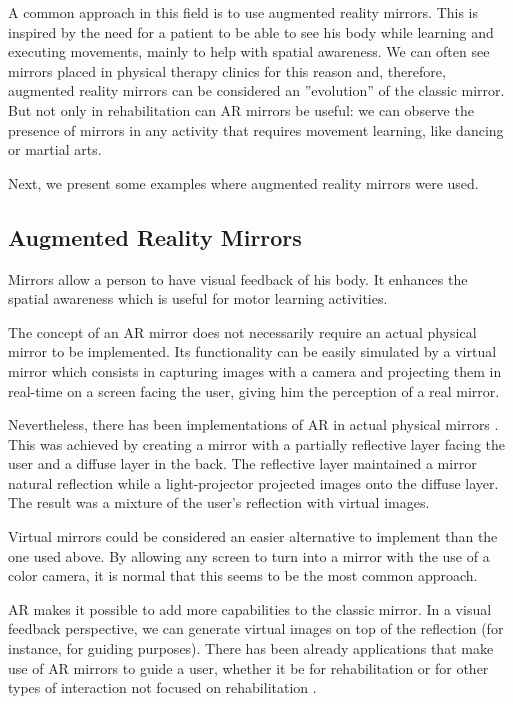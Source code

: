 A common approach in this field is to use augmented reality mirrors. 
This is inspired by the need for a patient to be able to see his body while
learning and executing movements, mainly to help with spatial awareness. We can often
see mirrors placed in physical therapy clinics for this reason and, therefore, 
augmented reality mirrors can be considered an ''evolution'' of the classic mirror.
But not only in rehabilitation can \ac{AR} mirrors be useful: we can observe 
the presence of mirrors in any activity that requires movement learning, like dancing or martial arts.

Next, we present some examples where augmented reality mirrors were used.



\subsection{Augmented Reality Mirrors}
\label{RW-mirrors}
Mirrors allow a person to have visual feedback of his body. It enhances the spatial awareness which is useful for motor learning activities.

The concept of an \ac{AR} mirror does not necessarily require an 
actual physical mirror to be implemented. 
Its functionality can be easily simulated by a virtual mirror 
which consists in capturing images with a camera and projecting 
them in real-time on a screen facing the user, 
giving him the perception of a real mirror. 

Nevertheless, there has been implementations of \ac{AR} in actual physical mirrors \cite{Anderson}. 
This was achieved by creating a mirror with a partially reflective layer facing the user and a diffuse layer in the back. 
The reflective layer maintained a mirror natural reflection while a light-projector projected images onto the diffuse layer.
The result was a mixture of the user's reflection with virtual images.

Virtual mirrors could be considered an easier alternative to implement than the one used above. 
By allowing any screen to turn into a mirror with the use of a color camera, 
it is normal that this seems to be the most common approach.

%

\ac{AR} makes it possible to add more capabilities to the classic mirror. 
In a visual feedback perspective, we can generate virtual images on top of the reflection (for instance, for guiding purposes). 
There has been already applications that make use of \ac{AR} mirrors to guide a user, whether it be for rehabilitation \cite{Tang2014a,Velloso2013,Klein2013} or for other types of interaction not focused on rehabilitation \cite{Alhamid2012a,blum2012}.

